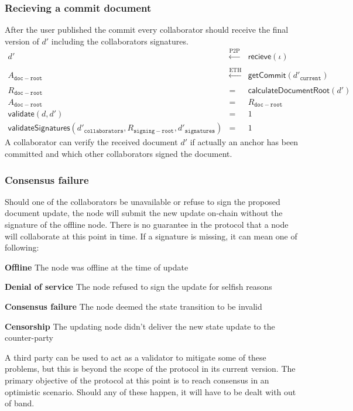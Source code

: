 \subsubsection{Recieving a commit document}
After the user published the commit every collaborator should receive the final version of $d'$ including the collaborators signatures.
\begin{eqnarray}
    d' & \xleftarrow[]{\text{P2P}} & \mathsf{recieve}(\iota) \\
        A_{\mathtt{doc-root}} & \xleftarrow[]{\text{ETH}} & \mathsf{getCommit}(d'_{\mathtt{current}}) \\
    R_{\mathtt{doc-root}} & = & \mathsf{calculateDocumentRoot}(d')  \\
    A_{\mathtt{doc-root}} &= &R_{\mathtt{doc-root}} \\
   \mathsf{validate}(d, d') & = & 1\\
     \mathsf{validateSignatures}(d'_{\mathtt{collaborators}},R_{\mathtt{signing-root}},d'_{\mathtt{signatures}}) & = & 1
\end{eqnarray}
A collaborator can verify the received document $d'$ if actually an anchor has been committed and which other collaborators signed the document.

\subsubsection{Consensus failure}
Should one of the collaborators be unavailable or refuse to sign the proposed document update, the node will submit the new update on-chain without the signature of the offline node. There is no guarantee in the protocol that a node will collaborate at this point in time. If a signature is missing, it can mean one of following:
\begin{description}
    \item{\textbf{Offline}} The node was offline at the time of update
    \item{\textbf{Denial of service}} The node refused to sign the update for selfish reasons
    \item{\textbf{Consensus failure}} The node deemed the state transition to be invalid
    \item{\textbf{Censorship}} The updating node didn't deliver the new state update to the counter-party
\end{description}
A third party can be used to act as a validator to mitigate some of these problems, but this is beyond the scope of the protocol in its current version. The primary objective of the protocol at this point is to reach consensus in an optimistic scenario. Should any of these happen, it will have to be dealt with out of band.
